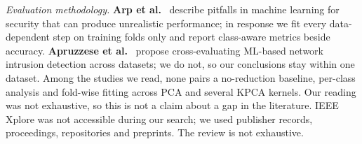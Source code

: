 \documentclass[runningheads]{llncs}
\begin{document}
\textit{Evaluation methodology.} \textbf{Arp et al.}~\cite{arp2022} describe pitfalls in machine learning for security that can produce unrealistic performance; in response we fit every data-dependent step on training folds only and report class-aware metrics beside accuracy. \textbf{Apruzzese et al.}~\cite{apruzzese2022} propose cross-evaluating ML-based network intrusion detection across datasets; we do not, so our conclusions stay within one dataset. Among the studies we read, none pairs a no-reduction baseline, per-class analysis and fold-wise fitting across PCA and several KPCA kernels. Our reading was not exhaustive, so this is not a claim about a gap in the literature. IEEE Xplore was not accessible during our search; we used publisher records, proceedings, repositories and preprints. The review is not exhaustive.
\end{document}
